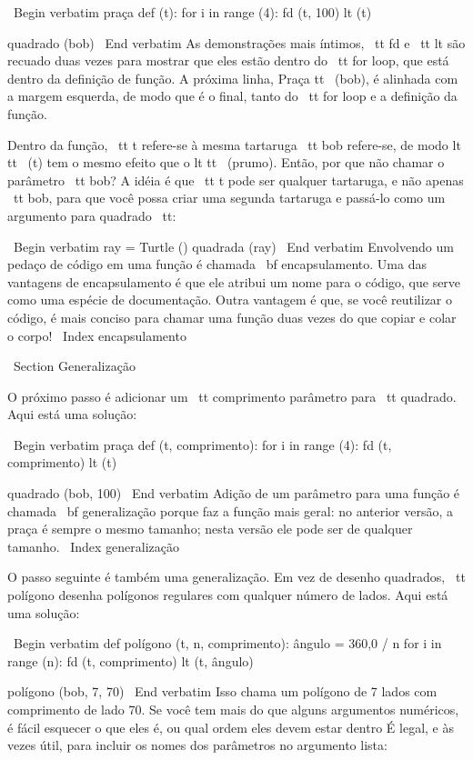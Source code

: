 \documentclass[10pt]{book}
\begin{document}
{\ Begin {verbatim}
praça def (t):
    for i in range (4):
        fd (t, 100)
        lt (t)

quadrado (bob)
\ End {verbatim}
%
As demonstrações mais íntimos, {\ tt fd} e {\ tt lt} são
recuado duas vezes para mostrar que eles estão dentro do {\ tt for} loop,
que está dentro da definição de função. A próxima linha,
{Praça tt \ (bob)}, é alinhada com a margem esquerda, de modo que é o
final, tanto do {\ tt for} loop e a definição da função.

Dentro da função, {\ tt t} refere-se à mesma tartaruga {\ tt bob}
refere-se, de modo {lt tt \ (t)} tem o mesmo efeito que o {lt tt \ (prumo)}.
Então, por que não chamar o parâmetro {\ tt bob}? A idéia é que {\ tt t}
pode ser qualquer tartaruga, e não apenas {\ tt bob}, para que você possa criar
uma segunda tartaruga e passá-lo como um argumento para {quadrado \ tt}:

\ Begin {verbatim}
ray = Turtle ()
quadrada (ray)
\ End {verbatim}
%
Envolvendo um pedaço de código em uma função é chamada {\ bf
encapsulamento}. Uma das vantagens de encapsulamento é que ele
atribui um nome para o código, que serve como uma espécie de documentação.
Outra vantagem é que, se você reutilizar o código, é mais conciso
para chamar uma função duas vezes do que copiar e colar o corpo!
\ Index {} encapsulamento


\ Section {} Generalização

O próximo passo é adicionar um {\ tt comprimento} parâmetro para {\ tt quadrado}.
Aqui está uma solução:

\ Begin {verbatim}
praça def (t, comprimento):
    for i in range (4):
        fd (t, comprimento)
        lt (t)

quadrado (bob, 100)
\ End {verbatim}
%
Adição de um parâmetro para uma função é chamada {\ bf generalização}
porque faz a função mais geral: no anterior
versão, a praça é sempre o mesmo tamanho; nesta versão
ele pode ser de qualquer tamanho.
\ Index {generalização}

O passo seguinte é também uma generalização. Em vez de desenho
quadrados, {\ tt polígono} desenha polígonos regulares com qualquer número de
lados. Aqui está uma solução:

\ Begin {verbatim}
def polígono (t, n, comprimento):
    ângulo = 360,0 / n
    for i in range (n):
        fd (t, comprimento)
        lt (t, ângulo)

polígono (bob, 7, 70)
\ End {verbatim}
%
Isso chama um polígono de 7 lados com comprimento de lado 70. Se você tem
mais do que alguns argumentos numéricos, é fácil esquecer o que eles
é, ou qual ordem eles devem estar dentro É legal, e às vezes
útil, para incluir os nomes dos parâmetros no argumento
lista:

}
\end{document}
